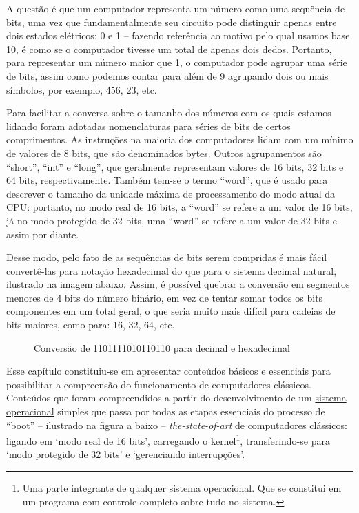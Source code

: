 A questão é que um computador representa um número como uma sequência de bits, uma vez que fundamentalmente seu circuito pode distinguir apenas entre dois estados elétricos: 0 e 1 – fazendo referência ao motivo pelo qual usamos base 10, é como se o computador tivesse um total de apenas dois dedos. Portanto, para representar um número maior que 1, o computador pode agrupar uma série de bits, assim como podemos contar para além de 9 agrupando dois ou mais símbolos, por exemplo, 456, 23, etc.

Para facilitar a conversa sobre o tamanho dos números com os quais estamos lidando foram adotadas nomenclaturas para séries de bits de certos comprimentos. As instruções na maioria dos computadores lidam com um mínimo de valores de 8 bits, que são denominados bytes. Outros agrupamentos são ``short'', ``int'' e ``long'', que geralmente representam valores de 16 bits, 32 bits e 64 bits, respectivamente. Também tem-se o termo ``word'', que é usado para descrever o tamanho da unidade máxima de processamento do modo atual da CPU: portanto, no modo real de 16 bits, a ``word'' se refere a um valor de 16 bits, já no modo protegido de 32 bits, uma ``word'' se refere a um valor de 32 bits e assim por diante.

Desse modo, pelo fato de as sequências de bits serem compridas é mais fácil convertê-las para notação hexadecimal do que para o sistema decimal natural, ilustrado na imagem abaixo. Assim, é possível quebrar a conversão em segmentos menores de 4 bits do número binário, em vez de tentar somar todos os bits componentes em um total geral, o que seria muito mais difícil para cadeias de bits maiores, como para: 16, 32, 64, etc. 

\vspace{1cm}
\begin{figure}[H] \centering 
  \caption{\label{binary_conversions} Conversão de 1101111010110110 para decimal e hexadecimal} 
\end{figure}

Esse capítulo constituiu-se em apresentar conteúdos básicos e essenciais para possibilitar a compreensão do funcionamento de computadores clássicos. Conteúdos que foram compreendidos a partir do desenvolvimento de um \href{https://github.com/gzsig/zsig-OS}{sistema operacional} simples que passa por todas as etapas essenciais do processo de ``boot'' – ilustrado na figura a baixo – \textit{the-state-of-art} de computadores clássicos: ligando em `modo real de 16 bits', carregando o kernel\footnote{Uma parte integrante de qualquer sistema operacional. Que se constitui em um programa com controle completo sobre tudo no sistema.}, transferindo-se para `modo protegido de 32 bits' e `gerenciando interrupções'.

